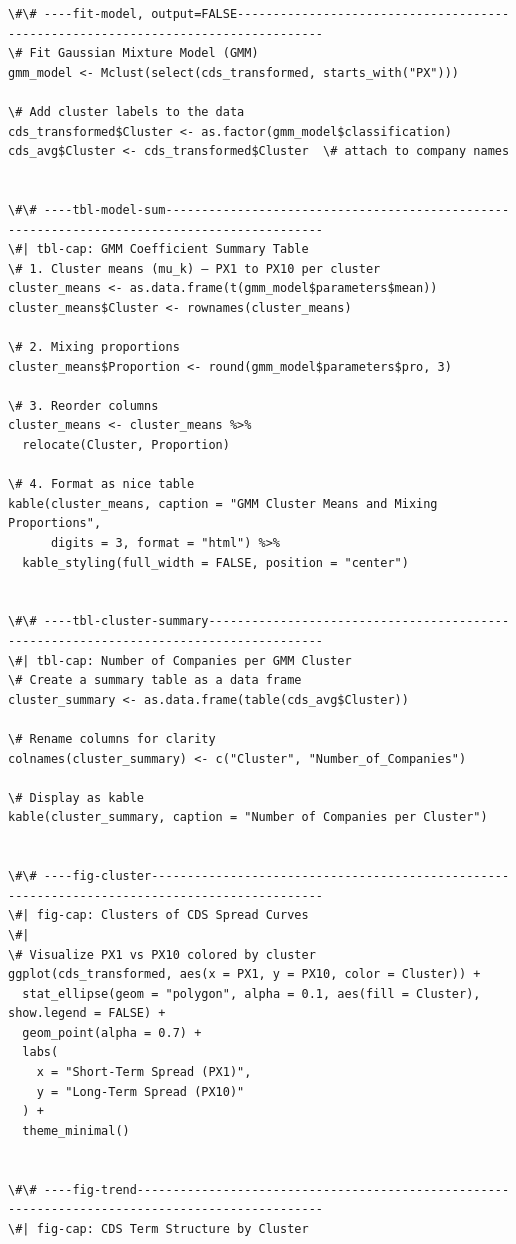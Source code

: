 \documentclass[
  letterpaper,
  DIV=11,
  numbers=noendperiod]{scrartcl}
\begin{document}
\begin{verbatim}
\#\# ----fit-model, output=FALSE----------------------------------------------------------------------------------
\# Fit Gaussian Mixture Model (GMM)
gmm_model <- Mclust(select(cds_transformed, starts_with("PX")))

\# Add cluster labels to the data
cds_transformed$Cluster <- as.factor(gmm_model$classification)
cds_avg$Cluster <- cds_transformed$Cluster  \# attach to company names


\#\# ----tbl-model-sum--------------------------------------------------------------------------------------------
\#| tbl-cap: GMM Coefficient Summary Table
\# 1. Cluster means (mu_k) — PX1 to PX10 per cluster
cluster_means <- as.data.frame(t(gmm_model$parameters$mean))
cluster_means$Cluster <- rownames(cluster_means)

\# 2. Mixing proportions
cluster_means$Proportion <- round(gmm_model$parameters$pro, 3)

\# 3. Reorder columns
cluster_means <- cluster_means %>%
  relocate(Cluster, Proportion)

\# 4. Format as nice table
kable(cluster_means, caption = "GMM Cluster Means and Mixing Proportions",
      digits = 3, format = "html") %>%
  kable_styling(full_width = FALSE, position = "center")


\#\# ----tbl-cluster-summary--------------------------------------------------------------------------------------
\#| tbl-cap: Number of Companies per GMM Cluster
\# Create a summary table as a data frame
cluster_summary <- as.data.frame(table(cds_avg$Cluster))

\# Rename columns for clarity
colnames(cluster_summary) <- c("Cluster", "Number_of_Companies")

\# Display as kable
kable(cluster_summary, caption = "Number of Companies per Cluster")


\#\# ----fig-cluster----------------------------------------------------------------------------------------------
\#| fig-cap: Clusters of CDS Spread Curves
\#|
\# Visualize PX1 vs PX10 colored by cluster
ggplot(cds_transformed, aes(x = PX1, y = PX10, color = Cluster)) +
  stat_ellipse(geom = "polygon", alpha = 0.1, aes(fill = Cluster), show.legend = FALSE) +
  geom_point(alpha = 0.7) +
  labs(
    x = "Short-Term Spread (PX1)",
    y = "Long-Term Spread (PX10)"
  ) +
  theme_minimal()


\#\# ----fig-trend------------------------------------------------------------------------------------------------
\#| fig-cap: CDS Term Structure by Cluster


\end{verbatim}
\end{document}
